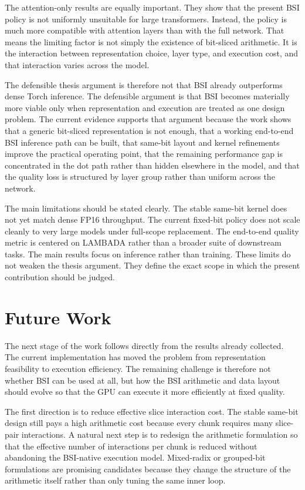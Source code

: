 The attention-only results are equally important. They show that the present BSI policy is not uniformly unsuitable for large transformers. Instead, the policy is much more compatible with attention layers than with the full network. That means the limiting factor is not simply the existence of bit-sliced arithmetic. It is the interaction between representation choice, layer type, and execution cost, and that interaction varies across the model.

The defensible thesis argument is therefore not that BSI already outperforms dense Torch inference. The defensible argument is that BSI becomes materially more viable only when representation and execution are treated as one design problem. The current evidence supports that argument because the work shows that a generic bit-sliced representation is not enough, that a working end-to-end BSI inference path can be built, that same-bit layout and kernel refinements improve the practical operating point, that the remaining performance gap is concentrated in the dot path rather than hidden elsewhere in the model, and that the quality loss is structured by layer group rather than uniform across the network.

The main limitations should be stated clearly. The stable same-bit kernel does not yet match dense FP16 throughput. The current fixed-bit policy does not scale cleanly to very large models under full-scope replacement. The end-to-end quality metric is centered on LAMBADA rather than a broader suite of downstream tasks. The main results focus on inference rather than training. These limits do not weaken the thesis argument. They define the exact scope in which the present contribution should be judged.

\section{Future Work}\label{sec:future-work}
The next stage of the work follows directly from the results already collected. The current implementation has moved the problem from representation feasibility to execution efficiency. The remaining challenge is therefore not whether BSI can be used at all, but how the BSI arithmetic and data layout should evolve so that the GPU can execute it more efficiently at fixed quality.

The first direction is to reduce effective slice interaction cost. The stable same-bit design still pays a high arithmetic cost because every chunk requires many slice-pair interactions. A natural next step is to redesign the arithmetic formulation so that the effective number of interactions per chunk is reduced without abandoning the BSI-native execution model. Mixed-radix or grouped-bit formulations are promising candidates because they change the structure of the arithmetic itself rather than only tuning the same inner loop.

